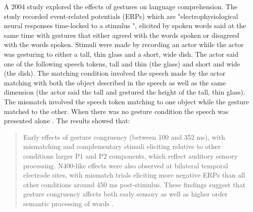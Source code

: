 \documentclass{article}
\begin{document}
A 2004 study explored the effects of gestures on language comprehension. The study recorded event‐related potentials (ERPs) which are "electrophysiological neural responses time-locked to a
stimulus \cite{https://doi.org/10.1111/1460-6984.12535}", elicited by spoken words said at the same time with gestures that either agreed with the words spoken or disagreed with the words spoken. Stimuli were made by recording an actor while the actor was gesturing to either a tall, thin glass and a short, wide dish. The actor said one of the following speech tokens, tall and thin (the glass) and short and wide (the dish). The matching condition involved the speech made by the actor matching with both the object described in the speech as well as the same dimension (the actor said the tall and gestured the height of the tall, thin glass). The mismatch involved the speech token matching to one object while the gesture matched to the other. When there was no gesture condition the speech was presented alone \cite{WU2007234}. The results showed that:
\begin{quote}
	Early effects of gesture congruency (between 100 and 352 ms), with mismatching and complementary stimuli eliciting relative to other conditions larger P1 and P2 components, which reflect auditory sensory processing. N400-like effects were also observed at bilateral temporal electrode sites, with mismatch trials eliciting more negative ERPs than all other conditions around 450 ms post-stimulus. These findings suggest that gesture congruency affects both early sensory as well as higher order semantic processing of words \cite{WU2007234}.
\end{quote}
\end{document}

